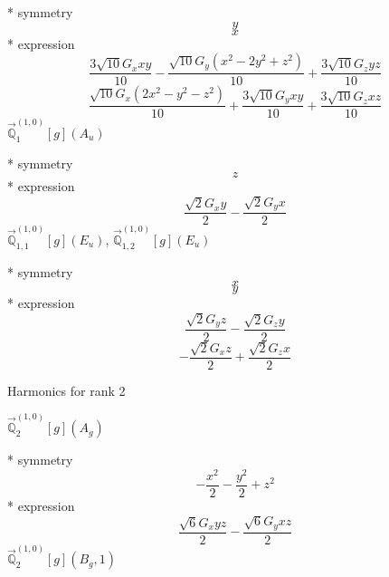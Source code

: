 \documentclass[fleqn,8pt]{jsarticle}
\begin{document}
\noindent\quad ** symmetry
\begin{dmath*}
y
\end{dmath*}
\begin{dmath*}
x
\end{dmath*}
\noindent\quad ** expression
\begin{dmath*}
\frac{3 \sqrt{10} G_{x} x y}{10} - \frac{\sqrt{10} G_{y} \left(x^{2} - 2 y^{2} + z^{2}\right)}{10} + \frac{3 \sqrt{10} G_{z} y z}{10}
\end{dmath*}
\begin{dmath*}
\frac{\sqrt{10} G_{x} \left(2 x^{2} - y^{2} - z^{2}\right)}{10} + \frac{3 \sqrt{10} G_{y} x y}{10} + \frac{3 \sqrt{10} G_{z} x z}{10}
\end{dmath*}
\noindent\quad $\vec{\mathbb{Q}}_{1}^{(1,0)}[g](A_{u})$

\noindent\quad ** symmetry
\begin{dmath*}
z
\end{dmath*}
\noindent\quad ** expression
\begin{dmath*}
\frac{\sqrt{2} G_{x} y}{2} - \frac{\sqrt{2} G_{y} x}{2}
\end{dmath*}
\noindent\quad $\vec{\mathbb{Q}}_{1,1}^{(1,0)}[g](E_{u})$, $\vec{\mathbb{Q}}_{1,2}^{(1,0)}[g](E_{u})$

\noindent\quad ** symmetry
\begin{dmath*}
x
\end{dmath*}
\begin{dmath*}
y
\end{dmath*}
\noindent\quad ** expression
\begin{dmath*}
\frac{\sqrt{2} G_{y} z}{2} - \frac{\sqrt{2} G_{z} y}{2}
\end{dmath*}
\begin{dmath*}
- \frac{\sqrt{2} G_{x} z}{2} + \frac{\sqrt{2} G_{z} x}{2}
\end{dmath*}

\noindent * Harmonics for rank 2

\noindent\quad $\vec{\mathbb{Q}}_{2}^{(1,0)}[g](A_{g})$

\noindent\quad ** symmetry
\begin{dmath*}
- \frac{x^{2}}{2} - \frac{y^{2}}{2} + z^{2}
\end{dmath*}
\noindent\quad ** expression
\begin{dmath*}
\frac{\sqrt{6} G_{x} y z}{2} - \frac{\sqrt{6} G_{y} x z}{2}
\end{dmath*}
\noindent\quad $\vec{\mathbb{Q}}_{2}^{(1,0)}[g](B_{g},1)$
\end{document}
